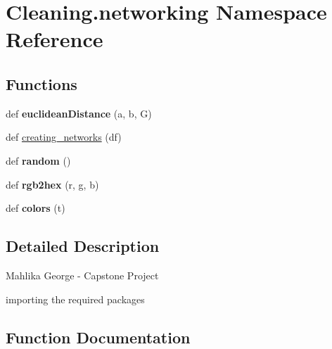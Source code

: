 \hypertarget{namespace_cleaning_1_1networking}{}\section{Cleaning.\+networking Namespace Reference}
\label{namespace_cleaning_1_1networking}
\subsection*{Functions}
\begin{DoxyCompactItemize}
\item 
\hypertarget{namespace_cleaning_1_1networking_ab91d1cce0384389533031423ed5301cd}{}def {\bfseries euclidean\+Distance} (a, b, G)\label{namespace_cleaning_1_1networking_ab91d1cce0384389533031423ed5301cd}

\item 
def \hyperlink{namespace_cleaning_1_1networking_a8a9fc88f6c9937a66d6c51fb419d5821}{creating\+\_\+networks} (df)
\item 
\hypertarget{namespace_cleaning_1_1networking_afa46f0124c56250c334de337ff538191}{}def {\bfseries random} ()\label{namespace_cleaning_1_1networking_afa46f0124c56250c334de337ff538191}

\item 
\hypertarget{namespace_cleaning_1_1networking_af6eb124a85630e4b243227aa74b7930c}{}def {\bfseries rgb2hex} (r, g, b)\label{namespace_cleaning_1_1networking_af6eb124a85630e4b243227aa74b7930c}

\item 
\hypertarget{namespace_cleaning_1_1networking_af7801a5d78a7a2e58531b57762fb35d3}{}def {\bfseries colors} (t)\label{namespace_cleaning_1_1networking_af7801a5d78a7a2e58531b57762fb35d3}

\end{DoxyCompactItemize}


\subsection{Detailed Description}
\begin{DoxyVerb}Mahlika George - Capstone Project

importing the required packages
\end{DoxyVerb}
 

\subsection{Function Documentation}
\hypertarget{namespace_cleaning_1_1networking_a8a9fc88f6c9937a66d6c51fb419d5821}{}
